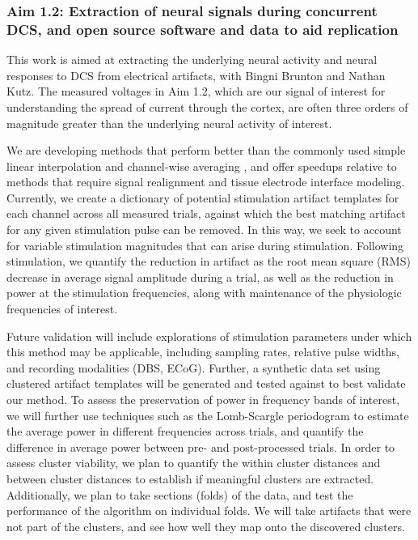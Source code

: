 \subsubsection{Aim 1.2: Extraction of neural signals during concurrent DCS, and open source software and data to aid replication}


This work is aimed at extracting the underlying neural activity and neural responses to DCS from electrical artifacts, with Bingni Brunton and Nathan Kutz. The measured voltages in Aim 1.2, which are our signal of interest for understanding the spread of current through the cortex, are often three orders of magnitude greater than the underlying neural activity of interest. 

We are developing methods that perform better than the commonly used simple linear interpolation and channel-wise averaging \cite{Zhou2018}, and offer speedups relative to methods that require signal realignment and tissue electrode interface modeling. Currently, we create a dictionary of potential stimulation artifact templates for each channel across all measured trials, against which the best matching artifact for any given stimulation pulse can be removed. In this way, we seek to account for variable stimulation magnitudes that can arise during stimulation. Following stimulation, we quantify the reduction in artifact as the root mean square (RMS) decrease in average signal amplitude during a trial, as well as the reduction in power at the stimulation frequencies, along with maintenance of the physiologic frequencies of interest. 

Future validation will include explorations of stimulation parameters under which this method may be applicable, including sampling rates, relative pulse widths, and recording modalities (DBS, ECoG). Further, a synthetic data set using clustered artifact templates will be generated and tested against to best validate our method. To assess the preservation of power in frequency bands of interest, we will further use techniques such as the Lomb-Scargle periodogram \cite{Muller2017} to estimate the average power in different frequencies across trials, and quantify the difference in average power between pre- and post-processed trials. In order to assess cluster viability, we plan to quantify the within cluster distances and between cluster distances to establish if meaningful clusters are extracted. Additionally, we plan to take sections (folds) of the data, and test the performance of the algorithm on individual folds. We will take artifacts that were not part of the clusters, and see how well they map onto the discovered clusters.


